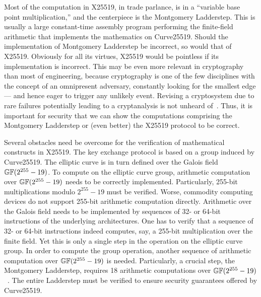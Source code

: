 Most of the computation in X25519, in trade parlance, is in a
``variable base point multiplication,'' and the centerpiece 
is the Montgomery Ladderstep. This is usually a
large constant-time assembly program performing the
finite-field arithmetic that implements the mathematics on Curve25519.
Should the implementation of Montgomery Ladderstep be incorrect, so
would that of X25519. Obviously for all its virtues, X25519 would be
pointless if its implementation is incorrect. This may be even more
relevant in cryptography than most of engineering, because cryptography is
one of the few disciplines with the concept of an omnipresent
adversary, constantly looking for the smallest edge --- and hence
eager to trigger any unlikely event. Revising a cryptosystem
due to rare failures potentially leading to a cryptanalysis is not
unheard of~\cite{HNPPSSW:03:IDFSNE}.
Thus, it is important for security that we can show the computations
comprising the Montgomery Ladderstep or (even better) the X25519
protocol to be correct. 

Several obstacles need be overcome for the verification of mathematical
constructs in X25519. The key exchange protocol is based on a
group induced by Curve25519. The elliptic
curve is in turn defined over the Galois field $\mathbb{GF}(2^{255} - 19)$. 
To compute on the elliptic curve group, arithmetic computation over
$\mathbb{GF}(2^{255} - 19)$ needs to be correctly implemented. 
Particularly, 255-bit multiplications modulo
$2^{255} - 19$ must be verified. Worse, commodity computing devices do
not support 255-bit arithmetic computation directly. Arithmetic over
the Galois field needs to be implemented by sequences of 32- or 64-bit
instructions of the underlying architectures. One has to
verify that a sequence of 32- or 64-bit instructions indeed
computes, say, a 255-bit multiplication over the finite field. Yet this
is only a single step in the operation on the elliptic curve group.
In order to compute the group operation, another sequence of
arithmetic computation over $\mathbb{GF}(2^{255} - 19)$ is
needed. Particularly, a crucial step,
the Montgomery Ladderstep, requires 18 arithmetic 
computations over $\mathbb{GF}(2^{255} - 19)$~\cite{M:87:SPEC}. 
The entire Ladderstep must be
verified to ensure security guarantees offered by Curve25519.

